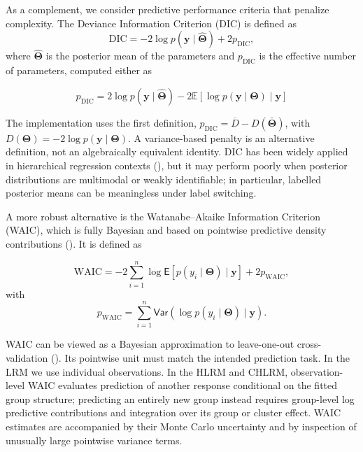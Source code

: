 \vspace{0.5cm}

As a complement, we consider predictive performance criteria that penalize complexity. The Deviance Information Criterion (DIC) is defined as
\begin{equation}
\label{DIC}
\text{DIC} = -2\log p(\bm{y}\mid \hat{\bm{\Theta}}) + 2p_{\text{DIC}},
\end{equation}
where $\hat{\bm{\Theta}}$ is the posterior mean of the parameters and $p_{\text{DIC}}$ is the effective number of parameters, computed either as

$$
p_{\text{DIC}} = 2\log p(\bm{y}\mid \hat{\bm{\Theta}}) - 2\mathbb{E}\left[\log p(\bm{y}\mid \bm{\Theta}) \mid \bm{y}\right]
$$

The implementation uses the first definition, $p_{\mathrm{DIC}}=\overline D-D(\bar{\bm\Theta})$, with $D(\bm\Theta)=-2\log p(\bm y\mid\bm\Theta)$. A variance-based penalty is an alternative definition, not an algebraically equivalent identity. DIC has been widely applied in hierarchical regression contexts (\cite{HOFF}), but it may perform poorly when posterior distributions are multimodal or weakly identifiable; in particular, labelled posterior means can be meaningless under label switching.

\vspace{0.5cm}

A more robust alternative is the Watanabe--Akaike Information Criterion (WAIC), which is fully Bayesian and based on pointwise predictive density contributions (\cite{watanabe}). It is defined as

\begin{equation}
\label{WAIC}
\text{WAIC} = -2\sum_{i=1}^n \log \mathsf{E}\left[p(y_i\mid \bm{\Theta}) \mid \bm{y}\right] + 2p_{\text{WAIC}},
\end{equation}
with
$$
p_{\text{WAIC}} = \sum_{i=1}^n \mathsf{Var}\left(\log p(y_i\mid \bm{\Theta}) \mid \mathbf{y}\right).
$$

WAIC can be viewed as a Bayesian approximation to leave-one-out cross-validation (\cite{watanabe}). Its pointwise unit must match the intended prediction task. In the LRM we use individual observations. In the HLRM and CHLRM, observation-level WAIC evaluates prediction of another response conditional on the fitted group structure; predicting an entirely new group instead requires group-level log predictive contributions and integration over its group or cluster effect. WAIC estimates are accompanied by their Monte Carlo uncertainty and by inspection of unusually large pointwise variance terms.

